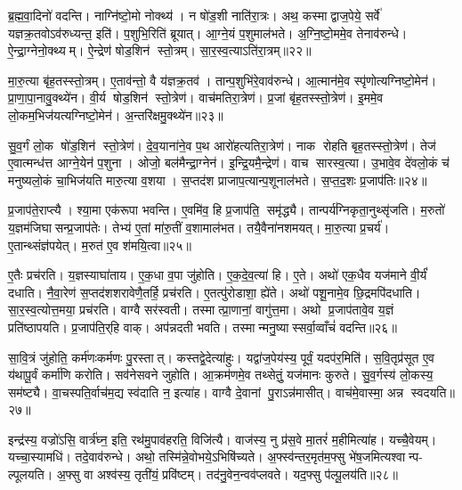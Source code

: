 ब्र॒ह्म॒वा॒दिनो॑ वदन्ति। नाग्नि॑ष्टो॒मो नोक्थ्य॑। न षो॑ड॒शी नाति॑रा॒त्रः। अथ॒ कस्माद्वाज॒पेये॒ सर्वे॑ यज्ञक्र॒तवोऽव॑रुध्यन्त॒ इति॑। प॒शुभि॒रिति॑ ब्रूयात्। आ॒ग्ने॒यं प॒शुमाल॑भते। अ॒ग्नि॒ष्टो॒ममे॒व तेनाव॑रुन्धे। ऐ॒न्द्रा॒ग्नेनो॒क्थ्यम्। ऐ॒न्द्रेण॑ षोड॒शिन॑ स्तो॒त्रम्। सा॒र॒स्व॒त्याऽति॑रा॒त्रम्॥२२॥

मा॒रु॒त्या बृ॑ह॒तस्स्तो॒त्रम्। ए॒ताव॑न्तो॒ वै य॑ज्ञक्र॒तव॑। तान्प॒शुभि॑रे॒वाव॑रुन्धे। आ॒त्मान॑मे॒व स्पृ॑णोत्यग्निष्टो॒मेन॑। प्रा॒णा॒पा॒नावु॒क्थ्ये॑न। वी॒र्य षोड॒शिन॑ स्तो॒त्रेण॑। वाच॑मतिरा॒त्रेण॑। प्र॒जां बृ॑ह॒तस्स्तो॒त्रेण॑। इ॒ममे॒व लो॒कम॒भिज॑यत्यग्निष्टो॒मेन॑। अ॒न्तरि॑क्षमु॒क्थ्ये॑न॥२३॥

सु॒व॒र्गं लो॒क षो॑ड॒शिन॑ स्तो॒त्रेण॑। दे॒व॒याना॑ने॒व प॒थ आरो॑हत्यतिरा॒त्रेण॑। नाक रोहति बृह॒तस्स्तो॒त्रेण॑। तेज॑ ए॒वात्मन्ध॑त्त आग्ने॒येन॑ प॒शुना। ओजो॒ बल॑मैन्द्रा॒ग्नेन॑। इ॒न्द्रि॒यमै॒न्द्रेण॑। वाच सारस्व॒त्या। उ॒भावे॒व दे॑वलो॒कं च॑ मनुष्यलो॒कं चा॒भिज॑यति मारु॒त्या व॒शया। स॒प्तद॑श प्राजाप॒त्यान्प॒शूनाल॑भते। स॒प्त॒द॒शः प्र॒जाप॑तिः॥२४॥

प्र॒जाप॑ते॒राप्त्यै। श्या॒मा एक॑रूपा भवन्ति। ए॒वमि॑व॒ हि प्र॒जाप॑ति॒ समृ॑द्ध्यै। तान्पर्य॑ग्निकृता॒नुथ्सृ॑जति। म॒रुतो॑ य॒ज्ञम॑जिघासन्प्र॒जाप॑तेः। तेभ्य॑ ए॒तां मा॑रु॒तीं व॒शामाल॑भत। तयै॒वैना॑नशमयत्। मा॒रु॒त्या प्र॒चर्य॑। ए॒तान्थ्संज्ञ॑पयेत्। म॒रुत॑ ए॒व श॑मयि॒त्वा॥२५॥

ए॒तैः प्रच॑रति। य॒ज्ञस्याघा॑ताय। ए॒क॒धा व॒पा जु॑होति। ए॒क॒दे॒व॒त्या॑ हि। ए॒ते। अथो॑ एक॒धैव यज॑माने वी॒र्यं॑ दधाति। नै॒वा॒रेण॑ स॒प्तद॑शशरावेणै॒तर्\mbox{}हि॒ प्रच॑रति। ए॒तत्पु॑रोडाशा॒ ह्ये॑ते। अथो॑ पशू॒नामे॒व छि॒द्रमपि॑दधाति। सा॒र॒स्व॒त्योत्त॒मया॒ प्रच॑रति। वाग्वै सर॑स्वती। तस्मात्प्रा॒णानां॒ वागु॑त्त॒मा। अथो प्र॒जाप॑तावे॒व य॒ज्ञं प्रति॑ष्ठापयति। प्र॒जाप॑ति॒र्‌हि वाक्। अप॑न्नदती भवति। तस्मान्मनु॒ष्यास्सर्वा॒व्वाँचं॑ वदन्ति॥२६॥\anuvakamend[अ॒ति॒रा॒त्रम॒न्तरि॑क्षमु॒क्थ्ये॑न प्र॒जाप॑तिश्शमयि॒त्वोत्त॒मया॒ प्रच॑रति॒ षट् च॑]

सा॒वि॒त्रं जु॑होति॒ कर्म॑णःकर्मणः पु॒रस्तात्। कस्तद्वे॒देत्या॑हुः। यद्वा॑ज॒पेय॑स्य॒ पूर्वं॒ यदप॑र॒मिति॑। स॒वि॒तृप्र॑सूत ए॒व य॑थापू॒र्वं कर्मा॑णि करोति। सव॑नेसवने जुहोति। आ॒क्रम॑णमे॒व तथ्सेतुं॒ यज॑मानः कुरुते। सु॒व॒र्गस्य॑ लो॒कस्य॒ सम॑ष्ट्यै। वा॒चस्पति॒र्वाच॑म॒द्य स्व॑दाति न॒ इत्या॑ह। वाग्वै दे॒वानां पु॒राऽन्न॑मासीत्। वाच॑मे॒वास्मा॒ अन्न स्वदयति॥२७॥

इन्द्र॑स्य॒ वज्रो॑ऽसि॒ वार्त्र॑घ्न॒ इति॒ रथ॑मु॒पाव॑हरति॒ विजि॑त्यै। वाज॑स्य॒ नु प्र॑स॒वे मा॒तरं॑ म॒हीमित्या॑ह। यच्चै॒वेयम्। यच्चा॒स्यामधि॑। तदे॒वाव॑रुन्धे। अथो॒ तस्मि॑न्ने॒वोभये॒ऽभिषि॑च्यते। अ॒फ्स्व॑न्तर॒मृत॑म॒फ्सु भे॑ष॒जमित्यश्वान्प- ल्पूलयति। अ॒फ्सु वा अश्व॑स्य॒ तृती॑यं॒ प्रवि॑ष्टम्। तद॑नु॒वेन॒न्वव॑प्लवते। यद॒फ्सु प॑ल्पू॒लय॑ति॥२८॥

